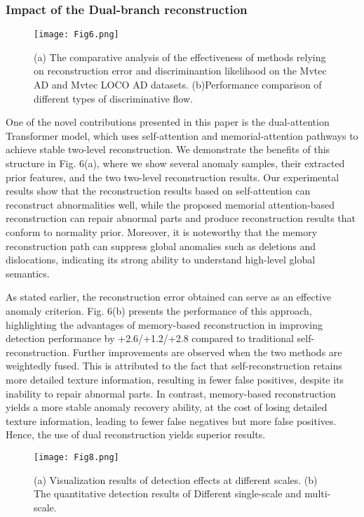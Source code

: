 \documentclass[journal]{IEEEtran}
\begin{document}
\subsubsection{Impact of the Dual-branch reconstruction}

\begin{figure}[t]
\centerline{\texttt{[image: Fig6.png]}}
\caption[width=8.8cm]{
(a) The comparative analysis of the effectiveness of methods relying on reconstruction error and discriminantion likelihood on the Mvtec AD and Mvtec LOCO AD datasets. (b)Performance comparison of different types of discriminative flow.
}
\label{fig1}
\end{figure}

 One of the novel contributions presented in this paper is the dual-attention Transformer model, which uses self-attention and memorial-attention pathways to achieve stable two-level reconstruction. We demonstrate the benefits of this structure in Fig. 6(a), where we show several anomaly samples, their extracted prior features, and the two two-level reconstruction results. Our experimental results show that the reconstruction results based on self-attention can reconstruct abnormalities well, while the proposed memorial attention-based reconstruction can repair abnormal parts and produce reconstruction results that conform to normality prior. Moreover, it is noteworthy that the memory reconstruction path can suppress global anomalies such as deletions and dislocations, indicating its strong ability to understand high-level global semantics.

As stated earlier, the reconstruction error obtained can serve as an effective anomaly criterion. Fig. 6(b) presents the performance of this approach, highlighting the advantages of memory-based reconstruction in improving detection performance by +2.6/+1.2/+2.8 compared to traditional self-reconstruction. Further improvements are observed when the two methods are weightedly fused. This is attributed to the fact that self-reconstruction retains more detailed texture information, resulting in fewer false positives, despite its inability to repair abnormal parts. In contrast, memory-based reconstruction yields a more stable anomaly recovery ability, at the cost of losing detailed texture information, leading to fewer false negatives but more false positives. Hence, the use of dual reconstruction yields superior results.


\begin{figure}[t]
\centerline{\texttt{[image: Fig8.png]}}
\caption[width=8.8cm]{
(a) Visualization results of detection effects at different scales. (b) The quantitative detection results of Different single-scale and multi-scale.
}
\label{fig1}
\end{figure}
\end{document}
